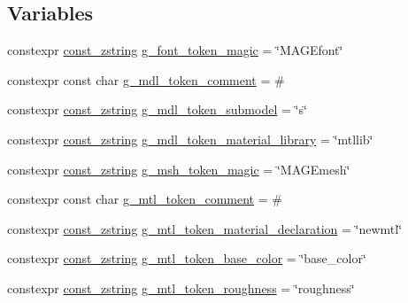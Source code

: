 \subsection*{Variables}
\begin{DoxyCompactItemize}
\item 
constexpr \hyperlink{namespacemage_abfd9206dc607ceb5d13ec68bf075a5c0}{const\+\_\+zstring} \hyperlink{namespacemage_1_1rendering_1_1loader_acc723a2644e074318376fec3a8278711}{g\+\_\+font\+\_\+token\+\_\+magic} = \char`\"{}M\+A\+G\+Efont\char`\"{}
\item 
constexpr const char \hyperlink{namespacemage_1_1rendering_1_1loader_accd79e03f94cc56cddd761a16d7d054e}{g\+\_\+mdl\+\_\+token\+\_\+comment} = \textquotesingle{}\#\textquotesingle{}
\item 
constexpr \hyperlink{namespacemage_abfd9206dc607ceb5d13ec68bf075a5c0}{const\+\_\+zstring} \hyperlink{namespacemage_1_1rendering_1_1loader_a007345d2fdd9db8cedb0a50ff2bface7}{g\+\_\+mdl\+\_\+token\+\_\+submodel} = \char`\"{}s\char`\"{}
\item 
constexpr \hyperlink{namespacemage_abfd9206dc607ceb5d13ec68bf075a5c0}{const\+\_\+zstring} \hyperlink{namespacemage_1_1rendering_1_1loader_ae399195268d14aceb61ebf3c020d0690}{g\+\_\+mdl\+\_\+token\+\_\+material\+\_\+library} = \char`\"{}mtllib\char`\"{}
\item 
constexpr \hyperlink{namespacemage_abfd9206dc607ceb5d13ec68bf075a5c0}{const\+\_\+zstring} \hyperlink{namespacemage_1_1rendering_1_1loader_ac002ee9ece4bdae053226c72336f84e3}{g\+\_\+msh\+\_\+token\+\_\+magic} = \char`\"{}M\+A\+G\+Emesh\char`\"{}
\item 
constexpr const char \hyperlink{namespacemage_1_1rendering_1_1loader_aa434371c99d44cc729773cec213def03}{g\+\_\+mtl\+\_\+token\+\_\+comment} = \textquotesingle{}\#\textquotesingle{}
\item 
constexpr \hyperlink{namespacemage_abfd9206dc607ceb5d13ec68bf075a5c0}{const\+\_\+zstring} \hyperlink{namespacemage_1_1rendering_1_1loader_a169d9aa2df11fab271c025c0937f1126}{g\+\_\+mtl\+\_\+token\+\_\+material\+\_\+declaration} = \char`\"{}newmtl\char`\"{}
\item 
constexpr \hyperlink{namespacemage_abfd9206dc607ceb5d13ec68bf075a5c0}{const\+\_\+zstring} \hyperlink{namespacemage_1_1rendering_1_1loader_a374c1913982c15a9b219effa2e11cad7}{g\+\_\+mtl\+\_\+token\+\_\+base\+\_\+color} = \char`\"{}base\+\_\+color\char`\"{}
\item 
constexpr \hyperlink{namespacemage_abfd9206dc607ceb5d13ec68bf075a5c0}{const\+\_\+zstring} \hyperlink{namespacemage_1_1rendering_1_1loader_a2ec32e8ddd043f1989ca6b58ad964c32}{g\+\_\+mtl\+\_\+token\+\_\+roughness} = \char`\"{}roughness\char`\"{}

\end{DoxyCompactItemize}
